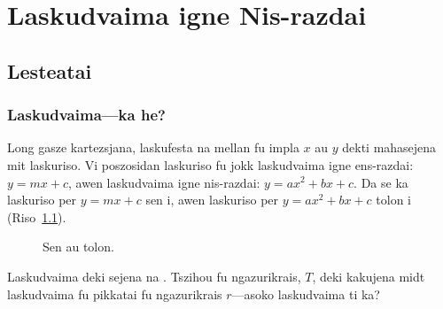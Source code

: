 \chapter{Laskudvaima igne Nis-razdai}

\section{Lesteatai}

\subsection{Laskudvaima---ka he?}

Long gasze kartezsjana, laskufesta na mellan fu impla \(x\) au \(y\) dekti mahasejena mit laskuriso.
Vi poszosidan laskuriso fu jokk laskudvaima igne ens-razdai: \(y = mx + c\), awen laskudvaima igne
nis-razdai: \(y = ax^2 + bx + c\). Da se ka laskuriso per \(y = mx + c\) sen i, awen laskuriso per
\(y = ax^2 + bx + c\) tolon i (Riso~\ref{fig:sen-au-tolon}).

\begin{figure}[htpb]
	\centering
	\hfill
	\hfill
	\hfill
	\caption{Sen au tolon.}
	\label{fig:sen-au-tolon}
\end{figure}

\begin{remark}
	Laskudvaima deki sejena na . Tszihou fu
	ngazurikrais, \(T\), deki kakujena midt laskudvaima fu pikkatai
	fu ngazurikrais \(r\)---asoko laskudvaima ti ka?
\end{remark}

